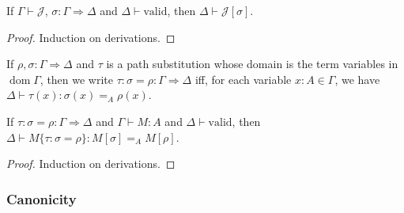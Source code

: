 \documentclass[a4paper,UKenglish]{lipics-v2016}
\newcommand*{\vald}{\ensuremath{\vdash \mathrm{valid}}}
\newcommand*{\dom}{\ensuremath{\operatorname{dom}}}
\theoremstyle{plain}
\theoremstyle{definition}
\begin{document}
\begin{lemma}
If $\Gamma \vdash \mathcal{J}$, $\sigma : \Gamma \Rightarrow \Delta$ and $\Delta \vald$, then $\Delta \vdash \mathcal{J} [\sigma]$.
\end{lemma}

\begin{proof}
Induction on derivations.
\end{proof}

\begin{definition}
If $\rho, \sigma : \Gamma \Rightarrow \Delta$ and $\tau$ is a path substitution whose domain
is the term variables in $\dom \Gamma$, then we write
$\tau : \sigma = \rho : \Gamma \Rightarrow \Delta$ iff, for each variable $x : A \in \Gamma$, we have
$\Delta \vdash \tau(x) : \sigma(x) =_A \rho(x)$.
\end{definition}

\begin{lemma}
\label{lm:pathsub}
If $\tau : \sigma = \rho : \Gamma \Rightarrow \Delta$ and $\Gamma \vdash M : A$ and $\Delta \vald$,
then $\Delta \vdash M \{ \tau : \sigma = \rho \} : M [ \sigma ] =_A M [ \rho ]$.
\end{lemma}

\begin{proof}
Induction on derivations.
\end{proof}

\subsubsection{Canonicity}
\end{document}
